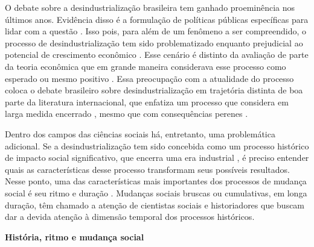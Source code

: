 O debate sobre a desindustrialização brasileira tem ganhado proeminência
nos últimos anos. Evidência disso é a formulação de políticas públicas
específicas para lidar com a questão
\citep{cndi_nova_2024}.
Isso pois, para além de um fenômeno a ser compreendido, o processo de
desindustrialização tem sido problematizado enquanto prejudicial ao
potencial de crescimento econômico
\citep{oreiro_desindustrializacao_2010}. Esse cenário é distinto da avaliação de parte da teoria
econômica que em grande maneira considerava esse processo como esperado
ou mesmo positivo
\citep{oreiromarconi2012}. Essa preocupação com a atualidade do processo coloca o debate
brasileiro sobre desindustrialização em trajetória distinta de boa parte
da literatura internacional, que enfatiza um processo que considera em
larga medida encerrado
 \citep{lawson_making_2020,strangleman_introduction_2013}, mesmo que com consequências
perenes \citep{linkon_half-life_2018,mah_industrial_2012}.

Dentro dos campos das ciências sociais há, entretanto, uma problemática
adicional. Se a desindustrialização tem sido concebida como um processo
histórico de impacto social significativo, que encerra uma era
industrial
\citep{strangleman_deindustrialisation_2017},
é preciso entender quais as características desse processo transformam
seus possíveis resultados. Nesse ponto, uma das características mais
importantes dos processos de mudança social é seu ritmo e duração
\citep{abbott_event_1984,pierson_politics_2004}. Mudanças sociais bruscas ou cumulativas, em longa
duração, têm chamado a atenção de cientistas sociais e historiadores que
buscam dar a devida atenção à dimensão temporal dos processos
históricos.

\textbf{História, ritmo e mudança social}

